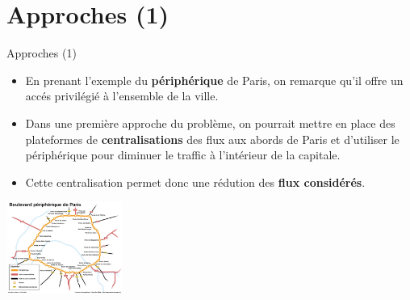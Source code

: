 \documentclass[8pt, aspectratio=169]{beamer}
\begin{document}
\section{Approches (1)}
\begin{frame}{Approches (1)}
\makeatletter
      \begin{minipage}[c][\textheight]{\textwidth}
        \begin{itemize}
            \item En prenant l'exemple du \textbf{périphérique} de Paris, on remarque qu'il offre un accés privilégié à l'ensemble de la ville.
            \saut
            
            \item Dans une première approche du problème, on pourrait mettre en place des plateformes de \textbf{centralisations} des flux aux abords de Paris et d'utiliser le périphérique pour diminuer le traffic à l'intérieur de la capitale.
            \saut
            
            \item Cette centralisation permet donc une rédution des \textbf{flux considérés}.
            \saut
        \end{itemize}
        \begin{center}
            \includegraphics[height=3cm, width=3.8cm, keepaspectratio=true]{plan-périphérique-paris.jpg}
        \end{center}
      \end{minipage}
\end{frame}


\end{document}
